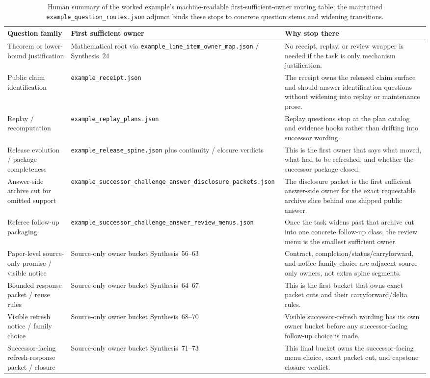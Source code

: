 \documentclass[11pt]{article}
\begin{document}
\begin{table}[t]
\centering
\small
\begin{tabularx}{\linewidth}{@{}Y Y Y@{}}
\toprule
Question family & First sufficient owner & Why stop there \\
\midrule
Theorem or lower-bound justification & Mathematical root via \texttt{example\_line\_item\_owner\_map.json} / Synthesis~24 & No receipt, replay, or review wrapper is needed if the task is only mechanism justification. \\
Public claim identification & \texttt{example\_receipt.json} & The receipt owns the released claim surface and should answer identification questions without widening into replay or maintenance prose. \\
Replay / recomputation & \texttt{example\_replay\_plans.json} & Replay questions stop at the plan catalog and evidence hooks rather than drifting into successor wording. \\
Release evolution / package completeness & \texttt{example\_release\_spine.json} plus continuity / closure verdicts & This is the first owner that says what moved, what had to be refreshed, and whether the successor package closed. \\
Answer-side archive cut for omitted support & \texttt{example\_successor\_challenge\_answer\_disclosure\_packets.json} & The disclosure packet is the first sufficient answer-side owner for the exact requestable archive slice behind one shipped public answer. \\
Referee follow-up packaging & \texttt{example\_successor\_challenge\_answer\_review\_menus.json} & Once the task widens past that archive cut into one concrete follow-up class, the review menu is the smallest sufficient owner. \\
Paper-level source-only promise / visible notice & Source-only owner bucket Synthesis~56--63 & Contract, completion/status/carryforward, and notice-family choice are adjacent source-only owners, not extra spine segments. \\
Bounded response packet / reuse rules & Source-only owner bucket Synthesis~64--67 & This is the first bucket that owns exact packet cuts and their carryforward/delta rules. \\
Visible refresh notice / family choice & Source-only owner bucket Synthesis~68--70 & Visible successor-refresh wording has its own owner bucket before any successor-facing follow-up choice is made. \\
Successor-facing refresh-response packet / closure & Source-only owner bucket Synthesis~71--73 & This final bucket owns the successor-facing menu choice, exact packet cut, and capstone closure verdict. \\
\bottomrule
\end{tabularx}
\caption{Human summary of the worked example's machine-readable first-sufficient-owner routing table; the maintained \texttt{example\_question\_routes.json} adjunct binds these stops to concrete question stems and widening transitions.}
\label{tab:workedexample-routingcuts}
\end{table}
\end{document}
